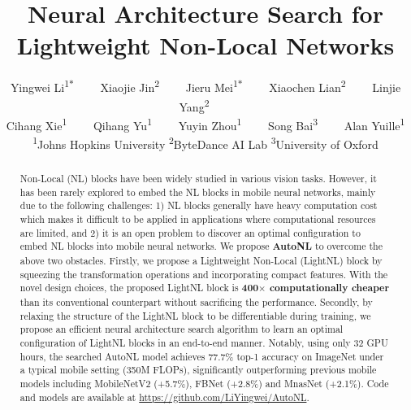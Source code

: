 \documentclass[10pt,twocolumn,letterpaper]{article}
\begin{document}
\title{Neural Architecture Search for Lightweight Non-Local Networks}
\author{
Yingwei Li\textsuperscript{\rm 1$\ast$}~~~~
Xiaojie Jin\textsuperscript{\rm 2}~~~~
Jieru Mei\textsuperscript{\rm 1$\ast$}~~~~
Xiaochen Lian\textsuperscript{\rm 2}~~~~
Linjie Yang\textsuperscript{\rm 2}~~~~\\
Cihang Xie\textsuperscript{\rm 1}~~~~
Qihang Yu\textsuperscript{\rm 1}~~~~
Yuyin Zhou\textsuperscript{\rm 1}~~~~
Song Bai\textsuperscript{\rm 3}~~~~ 
Alan Yuille\textsuperscript{\rm 1} \\
\textsuperscript{\rm 1}Johns Hopkins University \qquad\qquad
\textsuperscript{\rm 2}ByteDance AI Lab \qquad\qquad
\textsuperscript{\rm 3}University of Oxford \\
\vspace{-.5em}
}

\maketitle
\thispagestyle{empty}

\begin{abstract}
Non-Local (NL) blocks have been widely studied in various vision tasks. However, it has been rarely explored to embed the NL blocks in mobile neural networks, mainly due to the following challenges: 1) NL blocks generally have heavy computation cost which makes it difficult to be applied in applications where computational resources are limited, and 2) it is an open problem to discover an optimal configuration to embed NL blocks into mobile
neural networks.
We propose \textbf{AutoNL} to overcome the above two obstacles. Firstly, we propose a Lightweight Non-Local (LightNL) block by squeezing the transformation operations and incorporating compact features. With the novel design choices, the proposed LightNL block is \textbf{400$\times$ computationally cheaper} than its conventional counterpart without sacrificing the performance. Secondly, by relaxing the structure of the LightNL block to be differentiable during training, we propose an efficient neural architecture search algorithm to learn an optimal configuration of LightNL blocks in an end-to-end manner. Notably, using only $32$ GPU hours, the searched AutoNL model achieves 77.7\% top-1 accuracy on ImageNet under a typical mobile setting (350M FLOPs), significantly outperforming previous mobile models including MobileNetV2 (+5.7\%), FBNet (+2.8\%) and MnasNet (+2.1\%). Code and models are available at \url{https://github.com/LiYingwei/AutoNL}.
\end{abstract}
\end{document}
